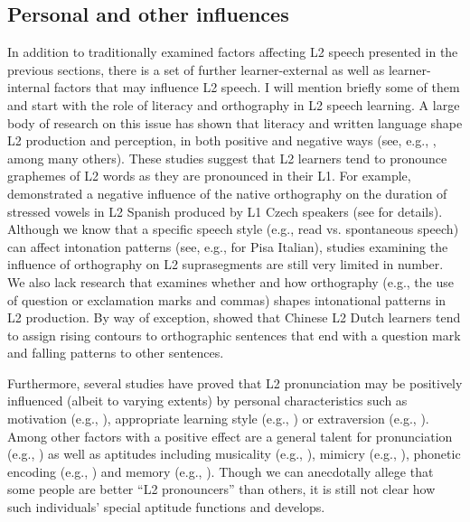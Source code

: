 \subsection{Personal and other influences}\label{sec:2.1.7}

In addition to traditionally examined factors affecting L2 speech presented in the previous sections, there is a set of further learner-external as well as learner-internal factors that may influence L2 speech. I will mention briefly some of them and start with the role of literacy and orthography in L2 speech learning. A large body of research on this issue has shown that literacy and written language shape L2 production and perception, in both positive and negative ways (see, e.g., \citealt{Rosenblum2005, PiskeEtAl2002, Bassetti2005,Bassetti2006, Bassetti2008, TaroneEtAl2013, EscuderoEtAl2014, Rafat2011,Rafat2015, Nimz2015}, among many others). These studies suggest that L2 learners tend to pronounce graphemes of L2 words as they are pronounced in their L1. For example, \citet{PeškováEtAl2017} demonstrated a negative influence of the native orthography on the duration of stressed vowels in L2 Spanish produced by L1 Czech speakers (see  for details). Although we know that a specific speech style (e.g., read vs. spontaneous speech) can affect intonation patterns (see, e.g.,  \citealt{GiliFivela2008} for Pisa Italian), studies examining the influence of orthography on L2 suprasegments are still very limited in number. We also lack research that examines whether and how orthography (e.g., the use of question or exclamation marks and commas) shapes intonational patterns in L2 production. By way of exception, \citet{HeEtAl2012} showed that Chinese L2 Dutch learners tend to assign rising contours to orthographic sentences that end with a question mark and falling patterns to other sentences.


Furthermore, several studies have proved that L2 pronunciation may be positively influenced (albeit to varying extents) by personal characteristics such as motivation (e.g., \citealt{Oxford1996, BongaertsEtAl1995,BongaertsEtAl1997, Moyer1999, Dörnyei2003, DörnyeiSkehan2003, DörnyeiUshioda2011}), appropriate learning style (e.g., \citealt{Reid1995}) or extraversion (e.g., \citealt{OxfordAnderson1995}). Among other factors with a positive effect are a general talent for pronunciation (e.g., \citealt{IoupEtAl1994}) as well as aptitudes including musicality (e.g., \citealt{SlevcMiyake2006, NardoReiterer2009, MilovanovEtAl2010}), mimicry (e.g., \citealt{Hinton2013}), phonetic encoding (e.g., \citealt{HuEtAl2013}) and memory (e.g., \citealt{Carroll1990, MiyakeFriedman1998, Walter2000, WenEtAl2015, Wen2016}). Though we can anecdotally allege that some people are better “L2 pronouncers” than others, it is still not clear how such individuals’ special aptitude functions and develops.



